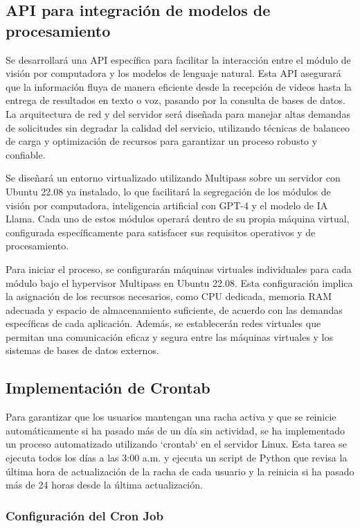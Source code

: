 \subsection{API para integración de modelos de procesamiento}

Se desarrollará una API específica para facilitar la interacción entre el módulo de visión por computadora y los modelos de lenguaje natural. Esta API asegurará que la información fluya de manera eficiente desde la recepción de videos hasta la entrega de resultados en texto o voz, pasando por la consulta de bases de datos. La arquitectura de red y del servidor será diseñada para manejar altas demandas de solicitudes sin degradar la calidad del servicio, utilizando técnicas de balanceo de carga y optimización de recursos para garantizar un proceso robusto y confiable.

Se diseñará un entorno virtualizado utilizando Multipass sobre un servidor con Ubuntu 22.08 ya instalado, lo que facilitará la segregación de los módulos de visión por computadora, inteligencia artificial con GPT-4 y el modelo de IA Llama. Cada uno de estos módulos operará dentro de su propia máquina virtual, configurada específicamente para satisfacer sus requisitos operativos y de procesamiento.

Para iniciar el proceso, se configurarán máquinas virtuales individuales para cada módulo bajo el hypervisor Multipass en Ubuntu 22.08. Esta configuración implica la asignación de los recursos necesarios, como CPU dedicada, memoria RAM adecuada y espacio de almacenamiento suficiente, de acuerdo con las demandas específicas de cada aplicación. Además, se establecerán redes virtuales que permitan una comunicación eficaz y segura entre las máquinas virtuales y los sistemas de bases de datos externos.

\subsection{Implementación de Crontab}

Para garantizar que los usuarios mantengan una racha activa y que se reinicie automáticamente si ha pasado más de un día sin actividad, se ha implementado un proceso automatizado utilizando `crontab` en el servidor Linux. Esta tarea se ejecuta todos los días a las 3:00 a.m. y ejecuta un script de Python que revisa la última hora de actualización de la racha de cada usuario y la reinicia si ha pasado más de 24 horas desde la última actualización.

\subsubsection{Configuración del Cron Job}

